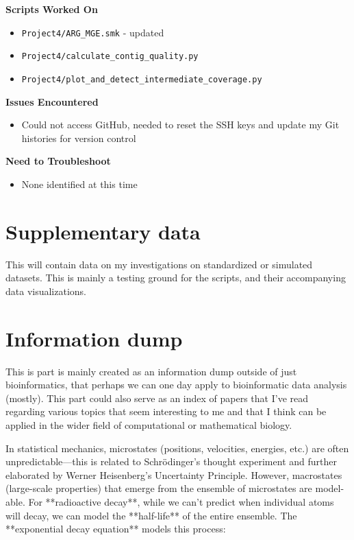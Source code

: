 \documentclass[11pt]{report}
\newcommand{\done}{\checkmark}
\begin{document}
{\begin{multicols}{2}
\textbf{Scripts Worked On}
\begin{itemize}
	\item \texttt{Project4/ARG\_MGE.smk} - updated
	\item [\done] \texttt  {Project4/calculate\_contig\_quality.py} 
	\item [\done] \texttt  {Project4/plot\_and\_detect\_intermediate\_coverage.py} 
\end{itemize}
\end{multicols}

\textbf{Issues Encountered}
\begin{itemize}
	\item [\done] Could not access GitHub, needed to reset the SSH keys and update my Git histories for version control
\end{itemize}

\textbf{Need to Troubleshoot}
\begin{itemize}
	\item None identified at this time
\end{itemize}


\newpage
\onecolumn


\newpage
\pagestyle{fancy}
\fancyhf{}
\fancyhead[C]{\leftmark}  %
\fancyhead[R]{\thepage}

\part{Supplementary data}
This will contain data on my investigations on standardized or simulated datasets. This is mainly a testing ground for the scripts, and their accompanying data visualizations. 

\renewcommand{\thesection}{\arabic{section}}
\setcounter{section}{0}
\setcounter{subsection}{0}


\part{Information dump}
This is part is mainly created as an information dump outside of just bioinformatics, that perhaps we can one day apply to bioinformatic data analysis (mostly). This part could also serve as an index of papers that I've read regarding various topics that seem interesting to me and that I think can be applied in the wider field of computational or mathematical biology. 



\begin{tcolorbox}[title=Exponential Decay and Biological Gene Expression, coltitle=AntiqueWhite1] In statistical mechanics, microstates (positions, velocities, energies, etc.) are often unpredictable—this is related to Schrödinger's thought experiment and further elaborated by Werner Heisenberg’s Uncertainty Principle. However, macrostates (large-scale properties) that emerge from the ensemble of microstates are model-able.
	For **radioactive decay**, while we can’t predict when individual atoms will decay, we can model the **half-life** of the entire ensemble. The **exponential decay equation** models this process:
	

\end{tcolorbox}}
\end{document}
